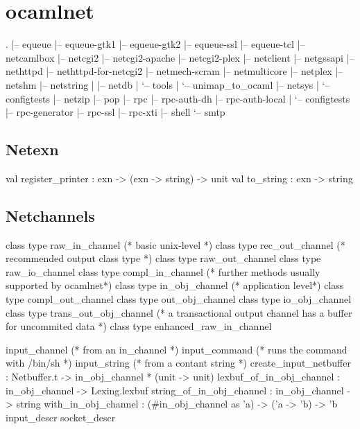 
\section{ocamlnet}

\begin{bashcode}
.
|-- equeue
|-- equeue-gtk1
|-- equeue-gtk2
|-- equeue-ssl
|-- equeue-tcl
|-- netcamlbox
|-- netcgi2
|-- netcgi2-apache
|-- netcgi2-plex
|-- netclient
|-- netgssapi
|-- nethttpd
|-- nethttpd-for-netcgi2
|-- netmech-scram
|-- netmulticore
|-- netplex
|-- netshm
|-- netstring
|   |-- netdb
|   `-- tools
|       `-- unimap_to_ocaml
|-- netsys
|   `-- configtests
|-- netzip
|-- pop
|-- rpc
|-- rpc-auth-dh
|-- rpc-auth-local
|   `-- configtests
|-- rpc-generator
|-- rpc-ssl
|-- rpc-xti
|-- shell
`-- smtp
\end{bashcode}

\subsection{Netexn}
\label{sec:Netexn}
\begin{ocamlcode}
val register_printer : exn -> (exn -> string) -> unit
val to_string : exn -> string
\end{ocamlcode}

\subsection{Netchannels}
\label{sec:Netchannels}

\begin{ocamlcode}
  class type raw_in_channel
  (* basic unix-level  *)
  class type rec_out_channel
  (* recommended output class type *)
  class type raw_out_channel
  class type raw_io_channel
  class type compl_in_channel
  (* further methods usually supported by ocamlnet*)
  class type in_obj_channel
  (* application level*)
  class type compl_out_channel
  class type out_obj_channel
  class type io_obj_channel
  class type trans_out_obj_channel
  (* a transactional output channel has a buffer for
  uncommited data
  *)
  class type enhanced_raw_in_channel
\end{ocamlcode}

\begin{ocamlcode}
  input_channel
  (* from an in_channel *)
  input_command
  (* runs the command with /bin/sh *)
  input_string
  (* from a contant string *)
  create_input_netbuffer : Netbuffer.t -> in_obj_channel * (unit -> unit)
  lexbuf_of_in_obj_channel : in_obj_channel -> Lexing.lexbuf
  string_of_in_obj_channel : in_obj_channel -> string
  with_in_obj_channel : (#in_obj_channel as 'a) -> ('a -> 'b) -> 'b
  input_descr
  socket_descr 
\end{ocamlcode}

